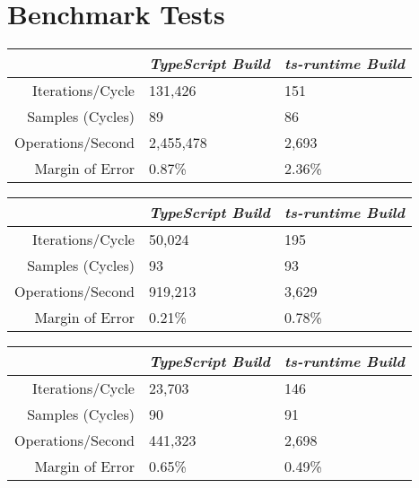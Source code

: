 \section{Benchmark Tests}
\label{app:sec:benchmark-results}

\begin{minipage}{\textwidth}
\begin{center}
{
\centering
\tabulinesep=1.2mm
\setlength{\tabcolsep}{5mm}
\def\arraystretch{1.25}
\small
\begin{tabu} to \textwidth {|r||X[c,m]|X[c,m]|}
  \hline
  & \emph{TypeScript Build} & \emph{ts-runtime Build} \\
  \hline
  \hline
  Iterations/Cycle  & 131,426 & 151 \\
  \hline
  Samples (Cycles)  & 89 & 86 \\
  \hline
  Operations/Second & 2,455,478 & 2,693 \\
  \hline
  Margin of Error   & 0.87\% & 2.36\% \\
  \hline
\end{tabu}
}
\end{center}

\begin{center}
{
\centering
\tabulinesep=1.2mm
\setlength{\tabcolsep}{5mm}
\def\arraystretch{1.25}
\small
\begin{tabu} to \textwidth {|r||X[c,m]|X[c,m]|}
  \hline
  & \emph{TypeScript Build} & \emph{ts-runtime Build} \\
  \hline
  \hline
  Iterations/Cycle  & 50,024 & 195 \\
  \hline
  Samples (Cycles)  & 93 & 93 \\
  \hline
  Operations/Second & 919,213 & 3,629 \\
  \hline
  Margin of Error   & 0.21\% & 0.78\% \\
  \hline
\end{tabu}
}
\end{center}

\begin{center}
{
\centering
\tabulinesep=1.2mm
\setlength{\tabcolsep}{5mm}
\def\arraystretch{1.25}
\small
\begin{tabu} to \textwidth {|r||X[c,m]|X[c,m]|}
  \hline
  & \emph{TypeScript Build} & \emph{ts-runtime Build} \\
  \hline
  \hline
  Iterations/Cycle  & 23,703 & 146 \\
  \hline
  Samples (Cycles)  & 90 & 91 \\
  \hline
  Operations/Second & 441,323 & 2,698 \\
  \hline
  Margin of Error   & 0.65\% & 0.49\% \\
  \hline
\end{tabu}
}
\end{center}


\end{minipage}
